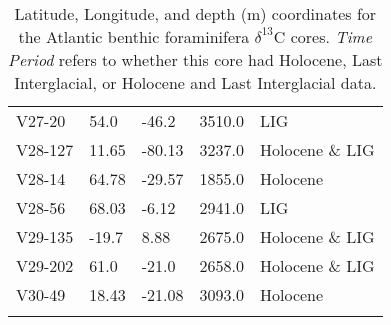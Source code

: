 \begin{longtable}{lllrl}
           V27-20 &     54.0 &     -46.2 &     3510.0 &             LIG \\
          V28-127 &    11.65 &    -80.13 &     3237.0 &  Holocene \& LIG \\
           V28-14 &    64.78 &    -29.57 &     1855.0 &        Holocene \\
           V28-56 &    68.03 &     -6.12 &     2941.0 &             LIG \\
          V29-135 &    -19.7 &      8.88 &     2675.0 &  Holocene \& LIG \\
          V29-202 &     61.0 &     -21.0 &     2658.0 &  Holocene \& LIG \\
           V30-49 &    18.43 &    -21.08 &     3093.0 &        Holocene \\
\caption{Latitude, Longitude, and depth (m) coordinates for the Atlantic benthic foraminifera $\delta^{13}$C cores. \textit{Time Period} refers to whether this core had Holocene, Last Interglacial, or Holocene and Last Interglacial data.}\end{longtable}
